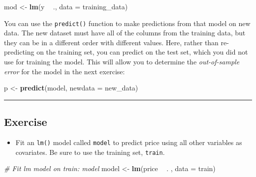 \documentclass[]{book}
\newenvironment{Shaded}{\begin{snugshade}}{\end{snugshade}}
\newcommand{\KeywordTok}[1]{\textcolor[rgb]{0.13,0.29,0.53}{\textbf{#1}}}
\newcommand{\DataTypeTok}[1]{\textcolor[rgb]{0.13,0.29,0.53}{#1}}
\newcommand{\StringTok}[1]{\textcolor[rgb]{0.31,0.60,0.02}{#1}}
\newcommand{\CommentTok}[1]{\textcolor[rgb]{0.56,0.35,0.01}{\textit{#1}}}
\newcommand{\OperatorTok}[1]{\textcolor[rgb]{0.81,0.36,0.00}{\textbf{#1}}}
\newcommand{\NormalTok}[1]{#1}
\providecommand{\tightlist}{%
  \setlength{\itemsep}{0pt}\setlength{\parskip}{0pt}}
\begin{document}
\begin{Shaded}
\begin{Highlighting}[]
\NormalTok{mod <-}\StringTok{ }\KeywordTok{lm}\NormalTok{(y }\OperatorTok{~}\StringTok{ }\NormalTok{., }\DataTypeTok{data =}\NormalTok{ training_data)}
\end{Highlighting}
\end{Shaded}

You can use the \texttt{predict()} function to make predictions from
that model on new data. The new dataset must have all of the columns
from the training data, but they can be in a different order with
different values. Here, rather than re-predicting on the training set,
you can predict on the test set, which you did not use for training the
model. This will allow you to determine the \emph{out-of-sample error}
for the model in the next exercise:

\begin{Shaded}
\begin{Highlighting}[]
\NormalTok{p <-}\StringTok{ }\KeywordTok{predict}\NormalTok{(model, }\DataTypeTok{newdata =}\NormalTok{ new_data)}
\end{Highlighting}
\end{Shaded}

\begin{center}\rule{0.5\linewidth}{\linethickness}\end{center}

\subsection*{Exercise}\label{exercise-3}

\begin{itemize}
\tightlist
\item
  Fit an \texttt{lm()} model called \texttt{model} to predict price
  using all other variables as covariates. Be sure to use the training
  set, \texttt{train}.
\end{itemize}

\begin{Shaded}
\begin{Highlighting}[]
\CommentTok{# Fit lm model on train: model}
\NormalTok{model <-}\StringTok{ }\KeywordTok{lm}\NormalTok{(price }\OperatorTok{~}\StringTok{ }\NormalTok{. , }\DataTypeTok{data =}\NormalTok{ train)}
\end{Highlighting}
\end{Shaded}
\end{document}
